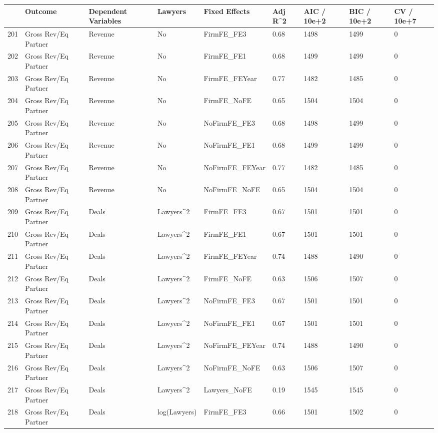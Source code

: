 \documentclass{article}
\begin{document}
\begin{table}[H]
\centering
\begin{tabular}{rllllllll}
  \hline
 & Outcome & Dependent Variables & Lawyers & Fixed Effects & Adj R^2 & AIC / 10e+2 & BIC / 10e+2 & CV / 10e+7 \\ 
  \hline
201 & Gross Rev/Eq Partner & Revenue & No & FirmFE\_FE3 & 0.68 & 1498 & 1499 & 0 \\ 
  202 & Gross Rev/Eq Partner & Revenue & No & FirmFE\_FE1 & 0.68 & 1499 & 1499 & 0 \\ 
  203 & Gross Rev/Eq Partner & Revenue & No & FirmFE\_FEYear & 0.77 & 1482 & 1485 & 0 \\ 
  204 & Gross Rev/Eq Partner & Revenue & No & FirmFE\_NoFE & 0.65 & 1504 & 1504 & 0 \\ 
  205 & Gross Rev/Eq Partner & Revenue & No & NoFirmFE\_FE3 & 0.68 & 1498 & 1499 & 0 \\ 
  206 & Gross Rev/Eq Partner & Revenue & No & NoFirmFE\_FE1 & 0.68 & 1499 & 1499 & 0 \\ 
  207 & Gross Rev/Eq Partner & Revenue & No & NoFirmFE\_FEYear & 0.77 & 1482 & 1485 & 0 \\ 
  208 & Gross Rev/Eq Partner & Revenue & No & NoFirmFE\_NoFE & 0.65 & 1504 & 1504 & 0 \\ 
  209 & Gross Rev/Eq Partner & Deals & Lawyers^2 & FirmFE\_FE3 & 0.67 & 1501 & 1501 & 0 \\ 
  210 & Gross Rev/Eq Partner & Deals & Lawyers^2 & FirmFE\_FE1 & 0.67 & 1501 & 1501 & 0 \\ 
  211 & Gross Rev/Eq Partner & Deals & Lawyers^2 & FirmFE\_FEYear & 0.74 & 1488 & 1490 & 0 \\ 
  212 & Gross Rev/Eq Partner & Deals & Lawyers^2 & FirmFE\_NoFE & 0.63 & 1506 & 1507 & 0 \\ 
  213 & Gross Rev/Eq Partner & Deals & Lawyers^2 & NoFirmFE\_FE3 & 0.67 & 1501 & 1501 & 0 \\ 
  214 & Gross Rev/Eq Partner & Deals & Lawyers^2 & NoFirmFE\_FE1 & 0.67 & 1501 & 1501 & 0 \\ 
  215 & Gross Rev/Eq Partner & Deals & Lawyers^2 & NoFirmFE\_FEYear & 0.74 & 1488 & 1490 & 0 \\ 
  216 & Gross Rev/Eq Partner & Deals & Lawyers^2 & NoFirmFE\_NoFE & 0.63 & 1506 & 1507 & 0 \\ 
  217 & Gross Rev/Eq Partner & Deals & Lawyers^2 & Lawyers\_NoFE & 0.19 & 1545 & 1545 & 0 \\ 
  218 & Gross Rev/Eq Partner & Deals & log(Lawyers) & FirmFE\_FE3 & 0.66 & 1501 & 1502 & 0 \\ 

\end{tabular}
\end{table}
\end{document}
